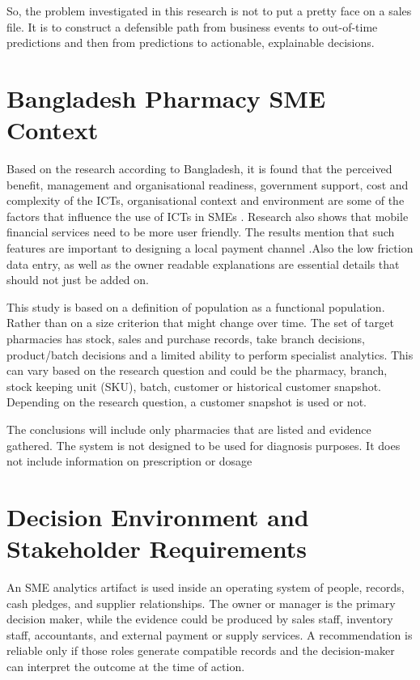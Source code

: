 \documentclass[a4paper,11pt,oneside]{book}
\theoremstyle{plain}
\theoremstyle{definition}
\theoremstyle{remark}
\begin{document}
So, the problem investigated in this research is not to put a pretty face on a sales file. It is to construct a defensible path from business events to out-of-time predictions and then from predictions to actionable, explainable decisions.


\section{Bangladesh Pharmacy SME Context}

Based on the research according to  Bangladesh, it is found that the perceived benefit, management and organisational readiness, government support, cost and complexity of the ICTs, organisational context and environment are some of the factors that influence the use of ICTs in SMEs \cite{hoque2016ict,shahadat2023digital}. Research also shows that mobile financial services need to be more  user friendly. The results mention  that such features are important  to designing a local payment channel .Also  the low friction data entry, as well as the owner readable explanations are essential details that should not just be added on.

This study is based on a definition of population as a functional population. Rather than on a size criterion that might change over time. The set of target pharmacies has stock, sales and purchase records, take branch decisions, product/batch decisions and a limited ability to perform specialist analytics. This can vary based on the research question and could be the pharmacy, branch, stock keeping unit (SKU), batch, customer or historical customer snapshot. Depending on the research question, a customer snapshot is used or not.

The conclusions will include only pharmacies that are listed and evidence gathered. The system is not designed to be used for diagnosis purposes. It does not include information on prescription or dosage


\section{Decision Environment and Stakeholder Requirements}

An SME analytics artifact is used inside an operating system of people, records, cash pledges, and supplier relationships. The owner or manager is the primary decision maker, while the evidence could be produced by sales staff, inventory staff, accountants, and external payment or supply services. A recommendation is reliable only if those roles generate compatible records and the decision-maker can interpret the outcome at the time of action.
\end{document}
